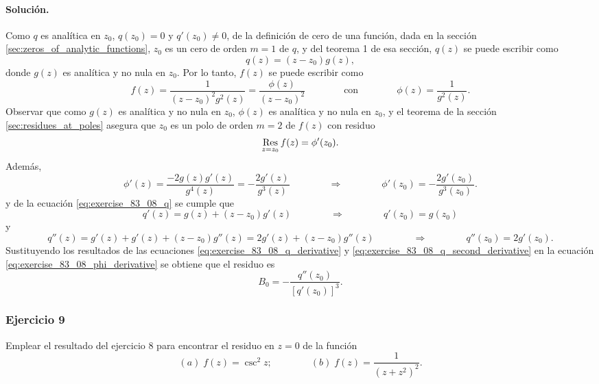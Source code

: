 \documentclass[a4paper]{report}
\def\Res{\qopname\relax m{Res}}
\begin{document}
\paragraph{Solución.} Como \(q\) es analítica en \(z_0\), \(q(z_0)=0\) y \(q'(z_0)\neq0\), de la definición de cero de una función, dada en la sección \ref{sec:zeros_of_analytic_functions}, \(z_0\) es un cero de orden \(m=1\) de \(q\), y del teorema 1 de esa sección, \(q(z)\) se puede escribir como
\begin{equation}\label{eq:exercise_83_08_q}
 q(z)=(z-z_0)g(z), 
\end{equation}
donde \(g(z)\) es analítica y no nula en \(z_0\). Por lo tanto, \(f(z)\) se puede escribir como
\[
 f(z)=\frac{1}{(z-z_0)^2g^2(z)}=\frac{\phi(z)}{(z-z_0)^2}
 \qquad\qquad\textrm{con}\qquad\qquad
 \phi(z)=\frac{1}{g^2(z)}.
\]
Observar que como \(g(z)\) es analítica y no nula en \(z_0\), \(\phi(z)\) es analítica y no nula en \(z_0\), y el teorema de la sección \ref{sec:residues_at_poles} asegura que \(z_0\) es un polo de orden \(m=2\) de \(f(z)\) con residuo
\[
 \Res_{z=z_0}f(z)=\phi'(z_0).
\]
Además,
\begin{equation}\label{eq:exercise_83_08_phi_derivative}
 \phi'(z)=\frac{-2g(z)g'(z)}{g^4(z)}=-\frac{2g'(z)}{g^3(z)}
 \qquad\qquad\Rightarrow\qquad\qquad
 \phi'(z_0)=-\frac{2g'(z_0)}{g^3(z_0)}. 
\end{equation}
y de la ecuación \ref{eq:exercise_83_08_q} se cumple que 
\begin{equation}\label{eq:exercise_83_08_q_derivative}
 q'(z)=g(z)+(z-z_0)g'(z)
 \qquad\qquad\Rightarrow\qquad\qquad
 q'(z_0)=g(z_0) 
\end{equation}
y 
\begin{equation}\label{eq:exercise_83_08_q_second_derivative}
 q''(z)=g'(z)+g'(z)+(z-z_0)g''(z)=2g'(z)+(z-z_0)g''(z)
 \qquad\qquad\Rightarrow\qquad\qquad
 q''(z_0)=2g'(z_0). 
\end{equation}
Sustituyendo los resultados de las ecuaciones \ref{eq:exercise_83_08_q_derivative} y \ref{eq:exercise_83_08_q_second_derivative} en la ecuación \ref{eq:exercise_83_08_phi_derivative} se obtiene que el residuo es 
\[
 B_0=-\frac{q''(z_0)}{[q'(z_0)]^3}.
\]

\subsubsection{Ejercicio 9} 

Emplear el resultado del ejercicio 8 para encontrar el residuo en \(z=0\) de la función
\[
 (\textit{a})\;f(z)=\csc^2z;\qquad\qquad (\textit{b})\;f(z)=\frac{1}{(z+z^2)^2}.
\]
\end{document}
